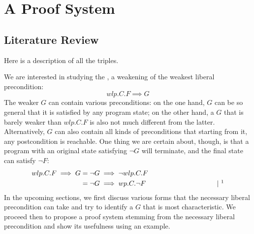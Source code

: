 \chapter{A Proof System}\label{ch:system} %

\section{Literature Review}

Here is a description of all the triples. 



We are interested in studying the , a weakening of the weakest liberal precondition: 
$$wlp.C.F\implies G$$
The weaker $G$ can contain various preconditions: on the one hand, $G$ can be so general that it is satisfied by any program state; on the other hand, a $G$ that is barely weaker than $wlp.C.F$ is also not much different from the latter. 
Alternatively, $G$ can also contain all kinds of preconditions that starting from it, any postcondition is reachable. 
One thing we are certain about, though, is that a program with an original state satisfying $\neg G$ will terminate, and the final state can satisfy $\neg F$: 
\begin{align*}
wlp.C.F\implies G & = \neg G \implies \neg wlp.C.F \\
	& = \neg G \implies wp.C.\neg F 
	\hspace{0.3\textwidth} | \ \todo{insert theorem: wlp and wp are conjugates} 
\end{align*}
In the upcoming sections, we first discuss various forms that the necessary liberal precondition can take and try to identify a $G$ that is most characteristic. 
We proceed then to propose a proof system stemming from the necessary liberal precondition and show its usefulness using an example.  

